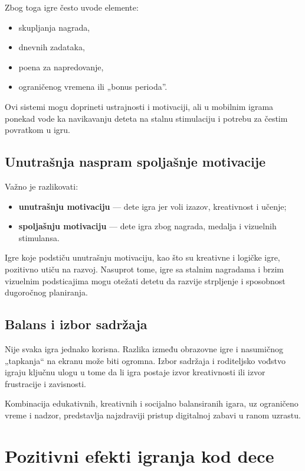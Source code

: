 \documentclass[a4paper,12pt]{article}
\begin{document}
Zbog toga igre često uvode elemente:
\begin{itemize}
    \item skupljanja nagrada,
    \item dnevnih zadataka,
    \item poena za napredovanje,
    \item ograničenog vremena ili „bonus perioda”.
\end{itemize}

Ovi sistemi mogu doprineti ustrajnosti i motivaciji, ali u mobilnim igrama ponekad vode ka navikavanju deteta na stalnu stimulaciju i potrebu za čestim povratkom u igru.

\subsection*{Unutrašnja naspram spoljašnje motivacije}
Važno je razlikovati:
\begin{itemize}
    \item \textbf{unutrašnju motivaciju} — dete igra jer voli izazov, kreativnost i učenje;
    \item \textbf{spoljašnju motivaciju} — dete igra zbog nagrada, medalja i vizuelnih stimulansa.
\end{itemize}

Igre koje podstiču unutrašnju motivaciju, kao što su kreativne i logičke igre, pozitivno utiču na razvoj. Nasuprot tome, igre sa stalnim nagradama i brzim vizuelnim podsticajima mogu otežati detetu da razvije strpljenje i sposobnost dugoročnog planiranja.

\subsection*{Balans i izbor sadržaja}
Nije svaka igra jednako korisna. Razlika između obrazovne igre i nasumičnog „tapkanja“ na ekranu može biti ogromna. Izbor sadržaja i roditeljsko vođstvo igraju ključnu ulogu u tome da li igra postaje izvor kreativnosti ili izvor frustracije i zavisnosti.

Kombinacija edukativnih, kreativnih i socijalno balansiranih igara, uz ograničeno vreme i nadzor, predstavlja najzdraviji pristup digitalnoj zabavi u ranom uzrastu.


\section{Pozitivni efekti igranja kod dece}
\end{document}

